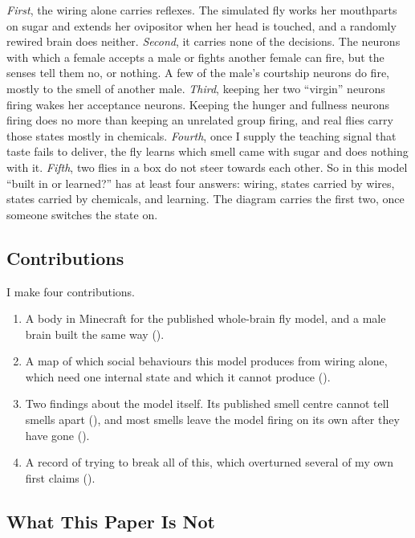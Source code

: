 \documentclass[11pt,a4paper]{article}
\begin{document}
\emph{First}, the wiring alone carries reflexes. The simulated fly works her mouthparts on sugar and extends her ovipositor when her head is touched, and a randomly rewired brain does neither. \emph{Second}, it carries none of the decisions. The neurons with which a female accepts a male or fights another female can fire, but the senses tell them no, or nothing. A few of the male's courtship neurons do fire, mostly to the smell of another male. \emph{Third}, keeping her two ``virgin'' neurons firing wakes her acceptance neurons. Keeping the hunger and fullness neurons firing does no more than keeping an unrelated group firing, and real flies carry those states mostly in chemicals. \emph{Fourth}, once I supply the teaching signal that taste fails to deliver, the fly learns which smell came with sugar and does nothing with it. \emph{Fifth}, two flies in a box do not steer towards each other. So in this model ``built in or learned?'' has at least four answers: wiring, states carried by wires, states carried by chemicals, and learning. The diagram carries the first two, once someone switches the state on.

\subsection{Contributions}

I make four contributions.

\begin{enumerate}[leftmargin=*]
  \item A body in Minecraft for the published whole-brain fly model, and a male brain built the same way ().
  \item A map of which social behaviours this model produces from wiring alone, which need one internal state and which it cannot produce ().
  \item Two findings about the model itself. Its published smell centre cannot tell smells apart (), and most smells leave the model firing on its own after they have gone ().
  \item A record of trying to break all of this, which overturned several of my own first claims ().
\end{enumerate}

\subsection{What This Paper Is Not}
\end{document}
